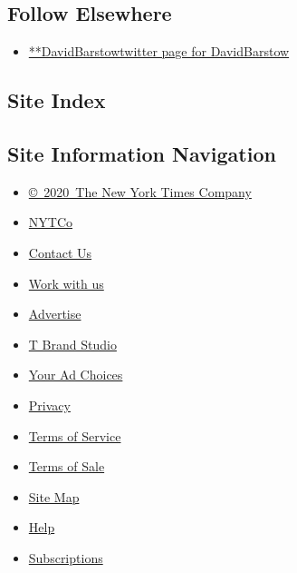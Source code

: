 \hypertarget{follow-elsewhere}{%
\subsection{Follow Elsewhere}\label{follow-elsewhere}}

\begin{itemize}
\tightlist
\item
  \href{https://twitter.com/DavidBarstow}{**DavidBarstowtwitter page for
  DavidBarstow}
\end{itemize}

\hypertarget{site-index}{%
\subsection{Site Index}\label{site-index}}

\hypertarget{site-information-navigation}{%
\subsection{Site Information
Navigation}\label{site-information-navigation}}

\begin{itemize}
\tightlist
\item
  \href{https://help.nytimes.com/hc/en-us/articles/115014792127-Copyright-notice}{©~2020~The
  New York Times Company}
\end{itemize}

\begin{itemize}
\tightlist
\item
  \href{https://www.nytco.com/}{NYTCo}
\item
  \href{https://help.nytimes.com/hc/en-us/articles/115015385887-Contact-Us}{Contact
  Us}
\item
  \href{https://www.nytco.com/careers/}{Work with us}
\item
  \href{https://nytmediakit.com/}{Advertise}
\item
  \href{http://www.tbrandstudio.com/}{T Brand Studio}
\item
  \href{https://www.nytimes.com/privacy/cookie-policy\#how-do-i-manage-trackers}{Your
  Ad Choices}
\item
  \href{https://www.nytimes.com/privacy}{Privacy}
\item
  \href{https://help.nytimes.com/hc/en-us/articles/115014893428-Terms-of-service}{Terms
  of Service}
\item
  \href{https://help.nytimes.com/hc/en-us/articles/115014893968-Terms-of-sale}{Terms
  of Sale}
\item
  \href{https://spiderbites.nytimes.com}{Site Map}
\item
  \href{https://help.nytimes.com/hc/en-us}{Help}
\item
  \href{https://www.nytimes.com/subscription?campaignId=37WXW}{Subscriptions}
\end{itemize}
